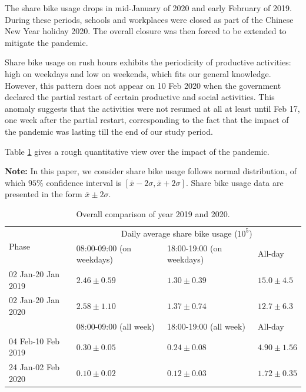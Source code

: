\documentclass[ijgi,submit,moreauthors,pdftex]{Definitions/mdpi}
\begin{document}
The share bike usage drops in mid-January of 2020 and early February of 2019.
During these periods, schools and workplaces were closed as part of the Chinese New Year holiday 2020.
The overall closure was then forced to be extended to mitigate the pandemic.

Share bike usage on rush hours exhibits the periodicity of productive activities: high on weekdays and low on weekends, which fits our general knowledge.
However, this pattern does not appear on 10 Feb 2020 when the government declared the partial restart of certain productive and social activities.
This anomaly suggests that the activities were not resumed at all at least until Feb 17, one week after the partial restart, corresponding to the fact that the impact of the pandemic was lasting till the end of our study period.

Table \ref{tab:overall_comparison} gives a rough quantitative view over the impact of the pandemic.

\textbf{Note:} In this paper, we consider share bike usage follows normal distribution, of which $95\%$ confidence interval is $[\bar{x}-2\sigma,\bar{x}+2\sigma]$.
Share bike usage data are presented in the form $\bar{x}\pm2\sigma$.

\begin{table}[ht]
    \centering
    \begin{tabular}{|l|l|l|l|}
        \hline
        \multirow{2}{*}{Phase} &\multicolumn{3}{c|}{Daily average share bike usage ($10^{5}$)}\\
        \cline{2-4}
        & 08:00-09:00 (on weekdays) & 18:00-19:00 (on weekdays) & All-day\\
        \hline
        02 Jan-20 Jan 2019 & $2.46\pm0.59$ & $1.30\pm0.39$ & $15.0\pm4.5$\\
        \hline
        02 Jan-20 Jan 2020 & $2.58\pm1.10$ & $1.37\pm0.74$ & $12.7\pm6.3$\\
        \hline
        \hline
        & 08:00-09:00 (all week)  & 18:00-19:00 (all week) & All-day\\
        \hline
        04 Feb-10 Feb 2019 & $0.30\pm0.05$ & $0.24\pm0.08$ & $4.90\pm1.56$\\
        \hline
        24 Jan-02 Feb 2020 & $0.10\pm0.02$ & $0.12\pm0.03$ & $1.72\pm0.35$\\
        \hline
    \end{tabular}
    \caption{Overall comparison of year 2019 and 2020.}
    \label{tab:overall_comparison}
\end{table}
\end{document}
